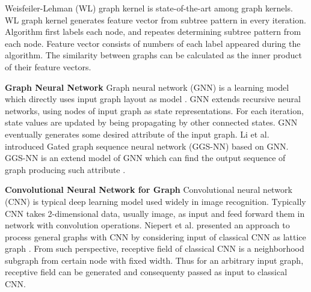 Weisfeiler-Lehman (WL) graph kernel \cite{shervashidze2011weisfeiler} is state-of-the-art among graph kernels.
WL graph kernel generates feature vector from subtree pattern in every iteration.
Algorithm first labels each node, and repeates determining subtree pattern from each node.
Feature vector consists of numbers of each label appeared during the algorithm.
The similarity between graphs can be calculated as the inner product of their feature vectors.

\textbf{Graph Neural Network} Graph neural network (GNN) is a learning model which directly uses input graph layout as model \cite{gori2005new}.
GNN extends recursive neural networks, using nodes of input graph as state representations.
For each iteration, state values are updated by being propagating by other connected states.
GNN eventually generates some desired attribute of the input graph.
Li et al. introduced Gated graph sequence neural network (GGS-NN) based on GNN.
GGS-NN is an extend model of GNN which can find the output sequence of graph producing such attribute \cite{li2015gated}.

\textbf{Convolutional Neural Network for Graph} Convolutional neural network (CNN) is typical deep learning model used widely in image recognition.
Typically CNN takes 2-dimensional data, usually image, as input and feed forward them in network with convolution operations.
Niepert et al. presented an approach to process general graphs with CNN by considering input of classical CNN as lattice graph \cite{niepert2016learning}.
From such perspective, receptive field of classical CNN is a neighborhood subgraph from certain node with fixed width.
Thus for an arbitrary input graph, receptive field can be generated and consequenty passed as input to classical CNN.